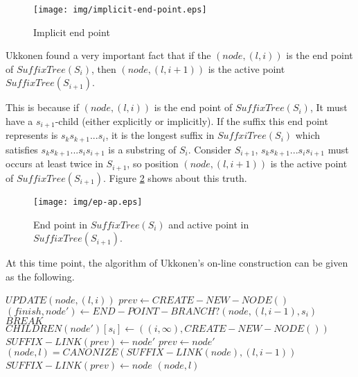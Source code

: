 \documentclass{article}
\begin{document}
\begin{figure}[htbp]
   \begin{center}
     \texttt{[image: img/implicit-end-point.eps]}
     \caption{Implicit end point}
     \label{fig:implicit-end-point}
   \end{center}
\end{figure}

Ukkonen found a very important fact that if the $(node, (l, i))$ is the end
point of $SuffixTree(S_i)$, then $(node, (l, i+1))$ is the active point 
$SuffixTree(S_{i+1})$.

This is because if $(node, (l, i))$ is the end point of $SuffixTree(S_i)$,
It must have a $s_{i+1}$-child (either explicitly or implicitly).
If the suffix this end point represents is $s_ks_{k+1}...s_i$, it is the longest
suffix in $SuffxiTree(S_i)$ which satisfies $s_ks_{k+1}...s_is_{i+1}$ is a substring
of $S_i$. Consider $S_{i+1}$, $s_ks_{k+1}...s_is_{i+1}$ must occurs at least
twice in $S_{i+1}$, so position $(node, (l, i+1))$ is the active point of
$SuffixTree(S_{i+1})$. Figure \ref{fig:ep-ap} shows about this truth.

\begin{figure}[htbp]
   \begin{center}
     \texttt{[image: img/ep-ap.eps]}
     \caption{End point in $SuffixTree(S_i)$ and active point in $SuffixTree(S_{i+1})$.}
     \label{fig:ep-ap}
   \end{center}
\end{figure}

At this time point, the algorithm of Ukkonen's on-line construction can 
be given as the following.

\begin{algorithmic}
\STATE $UPDATE(node, (l, i))$
  \STATE $prev \leftarrow CREATE-NEW-NODE()$
    \STATE $(finish, node') \leftarrow END-POINT-BRANCH?(node, (l, i-1), s_i)$
      \STATE $BREAK$
    \ENDIF
    \STATE $CHILDREN(node')[s_i] \leftarrow ((i, \infty), CREATE-NEW-NODE())$
    \STATE $SUFFIX-LINK(prev) \leftarrow node'$
    \STATE $prev \leftarrow node'$
    \STATE $(node, l) = CANONIZE(SUFFIX-LINK(node), (l, i-1))$
  \ENDWHILE
  \STATE $SUFFIX-LINK(prev) \leftarrow node$
  \RETURN $(node, l)$
\end{algorithmic}
\end{document}
